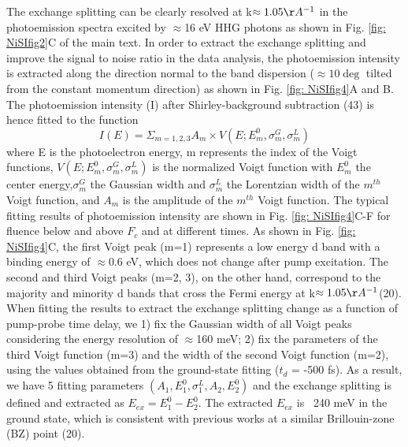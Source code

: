 The exchange splitting can be clearly resolved at k$\/\/ \approx 1.05\AA^{-1}$ in the photoemission spectra excited by $\approx$16 eV HHG photons as shown in Fig. \ref{fig: NiSIfig2}C of the main text. In order to extract the exchange splitting and improve the signal to noise ratio in the data analysis, the photoemission intensity is extracted along the direction normal to the band dispersion ($\approx 10\deg$ tilted from the constant momentum direction) as shown in Fig. \ref{fig: NiSIfig4}A and B. The photoemission intensity (I) after Shirley-background subtraction (43) is hence fitted to the function
\begin{equation}
I(E)=\Sigma_{m=1,2,3} A_m \times V(E;E_m^0,\sigma_m^G,\sigma_m^L)
\label{eqn:S2}
\end{equation}
where E is the photoelectron energy, m represents the index of the Voigt functions, $V(E;E_m^0,\sigma_m^G,\sigma_m^L)$ is the normalized Voigt function with $E_m^0$ the center energy,$\sigma_m^G$ the Gaussian width and $\sigma_m^L$ the Lorentzian width of the $m^{th}$ Voigt function, and $A_m$ is the amplitude of the $m^{th}$ Voigt function. The typical fitting results of photoemission intensity are shown in Fig. \ref{fig: NiSIfig4}C-F for fluence below and above $F_{c}$ and at different times. As shown in Fig. \ref{fig: NiSIfig4}C, the first Voigt peak (m=1) represents a low energy d band with a binding energy of $\approx$0.6 eV, which does not change after pump excitation. The second and third Voigt peaks (m=2, 3), on the other hand, correspond to the majority and minority d bands that cross the Fermi energy at k$\/\/ \approx  1.05 \AA^{-1}$(20). When fitting the results to extract the exchange splitting change as a function of pump-probe time delay, we 1) fix the Gaussian width of all Voigt peaks considering the energy resolution of $\approx$160 meV; 2) fix the parameters of the third Voigt function (m=3) and the width of the second Voigt function (m=2), using the values obtained from the ground-state fitting ($t_d$ = -500 fs). As a result, we have 5 fitting parameters $(A_1,E_1^0,\sigma_1^L,A_2,E_2^0)$ and the exchange splitting is defined and extracted as  $E_{ex}=E_1^0-E_2^0$. The extracted $E_{ex}$ is ~240 meV in the ground state, which is consistent with previous works at a similar Brillouin-zone (BZ) point (20). 

